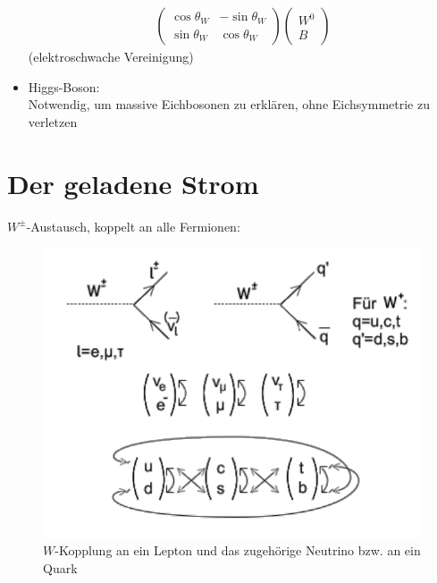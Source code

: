 \begin{itemize}
\begin{align}
\begin{pmatrix}
\cos \theta_W & - \sin \theta_W\\  \sin \theta_W & \cos \theta_W
\end{pmatrix} \begin{pmatrix}
W^0 \\ B
\end{pmatrix}
\end{align}
(\glqq elektroschwache Vereinigung\grqq{})
\item Higgs-Boson:\\
Notwendig, um massive Eichbosonen zu erklären, ohne Eichsymmetrie zu verletzen
\end{itemize}

\section{Der geladene Strom}

$W^\pm$-Austausch, koppelt an alle Fermionen:

\begin{figure}[!ht]
\centering
\includegraphics[width=.5\textwidth]{imgs/ep5-fig-8-1.pdf}
\caption{$W$-Kopplung an ein Lepton und das zugehörige Neutrino bzw. an ein Quark \label{fig:8.1}}
\end{figure}

